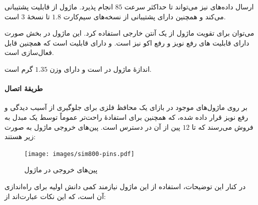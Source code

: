ارسال داده‌های  نیز می‌تواند تا حداکثر سرعت $85$ انجام پذیرد. ماژول از قابلیت‌  پشتیبانی می‌کند و همچنین دارای پشتیبانی از نسخه‌های سیم‌کارت $1.8$ تا نسخهٔ $3$ است.

می‌توان برای تقویت ماژول از یک آنتن خارجی استفاده کرد. این ماژول در بخش صورت دارای قابلیت های رفع نویز و رفع اکو نیز است. و دارای قابلیت  است که همچنین قابل فعال‌سازی است.

اندازهٔ ماژول در  است و دارای وزن $1.35$ گرم است.
\cite{sim800}

\paragraph{طریقهٔ اتصال}\label{par1:subsubsec1:subsec1:sec2:chap5}

بر روی ماژول‌های موجود در بازای یک محافظ فلزی برای جلوگیری از آسیب دیدگی و رفع نویز قرار داده شده، که همچنین برای استفادهٔ راحت‌تر عموماً توسط یک مبدل  به فروش می‌رسند که تا $12$ پین از آن در دسترس است.
پین‌های خروجی ماژول به صورت زیر هستند:

\begin{figure}[!h]
	\begin{center}
		\texttt{[image: images/sim800-pins.pdf]}
	\end{center}
	\caption{پین‌های خروجی در ماژول }
	\label{fig1:sec2:chap5}
\end{figure}


در کنار این توضیحات،‌ استفاده از این ماژول نیازمند کمی دانش اولیه برای راه‌اندازی آن است، که این نکات عبارت‌اند از:

